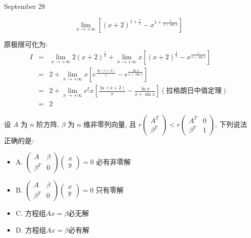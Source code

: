 \textcolor{purplea}{September 28}

\begin{example}[][Exam: 35.4.13]
	$$\lim\limits_{x\to +\infty}\left[(x+2)^{1+\frac{1}{x}}-x^{1+\frac{1}{x+\sin x}}\right]$$
\end{example}

\begin{solution}

	原极限可化为:  
	\begin{eqnarray*}
		I&=&\lim\limits_{x\to +\infty}2(x+2)^{\frac{1}{x}}+\lim\limits_{x\to +\infty}x\left[(x+2)^{\frac{1}{x}}-x^{\frac{1}{x+\sin x}}\right]\\
		&=&2+\lim\limits_{x\to +\infty}x\left[e^{\frac{\ln(x+2)}{x}}-e^{\frac{\ln x}{x+\sin x}}\right]\\
		&=&2+\lim\limits_{x\to +\infty}e^{\xi}x[\frac{\ln(x+2)}{x}-\frac{\ln x}{x+\sin x}](\text{拉格朗日中值定理})\\
		&=&2
	\end{eqnarray*}
\end{solution}


\begin{example}[][Exam: 35.4.14]
	设 $A$ 为 $n$ 阶方阵, $\beta$ 为 $n$ 维非零列向量, 且 $r
	\begin{pmatrix}
		A^T\\\beta^T
	\end{pmatrix} < r
	\begin{pmatrix}
	A^T&0\\\beta^T&1
	\end{pmatrix}$, 下列说法正确的是:  
	\begin{itemize}
		\item A. $
		\begin{pmatrix}
			A&\beta\\\beta^T&0
		\end{pmatrix}
		\begin{pmatrix}
			x\\y
		\end{pmatrix}=0$ 必有非零解
		\item B. $
		\begin{pmatrix}
			A&\beta\\\beta^T&0
		\end{pmatrix}
		\begin{pmatrix}
			x\\y
		\end{pmatrix}=0$ 只有零解
		\item C. 方程组$Ax=\beta$必无解
		\item D. 方程组$Ax=\beta$必有解
	\end{itemize}
\end{example}

